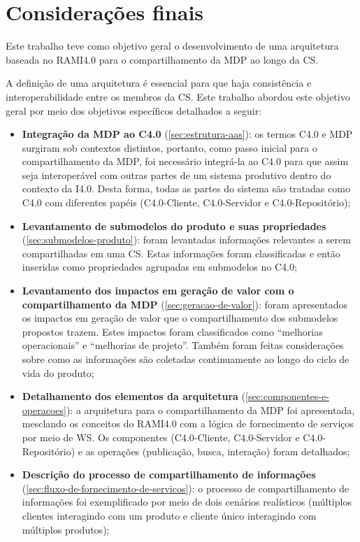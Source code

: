 \chapter{Considerações finais}
\label{cha:conclusao}

Este trabalho teve como objetivo geral o desenvolvimento de uma arquitetura baseada no RAMI4.0 para o compartilhamento da MDP ao longo da CS.

A definição de uma arquitetura é essencial para que haja consistência e interoperabilidade entre os membros da CS. Este trabalho abordou este objetivo geral por meio dos objetivos específicos detalhados a seguir:

\begin{itemize}
	\item \textbf{Integração da MDP ao C4.0} (\autoref{sec:estrutura-aas}): os termos C4.0 e MDP surgiram sob contextos distintos, portanto, como passo inicial para o compartilhamento da MDP, foi necessário integrá-la ao C4.0 para que assim seja interoperável com outras partes de um sistema produtivo dentro do contexto da I4.0. Desta forma, todas as partes do sistema são tratadas como C4.0 com diferentes papéis (C4.0-Cliente, C4.0-Servidor e C4.0-Repositório);
	\item \textbf{Levantamento de submodelos do produto e suas propriedades} (\autoref{sec:submodelos-produto}): foram levantadas informações relevantes a serem compartilhadas em uma CS. Estas informações foram classificadas e então inseridas como propriedades agrupadas em submodelos no C4.0;
	\item \textbf{Levantamento dos impactos em geração de valor com o compartilhamento da MDP} (\autoref{sec:geracao-de-valor}): foram apresentados os impactos em geração de valor que o compartilhamento dos submodelos propostos trazem. Estes impactos foram classificados como ``melhorias operacionais'' e ``melhorias de projeto''. Também foram feitas considerações sobre como as informações são coletadas continuamente ao longo do ciclo de vida do produto;
	\item \textbf{Detalhamento dos elementos da arquitetura} (\autoref{sec:componentes-e-operacoes}): a arquitetura para o compartilhamento da MDP foi apresentada, mesclando os conceitos do RAMI4.0 com a lógica de fornecimento de serviços por meio de WS. Os componentes (C4.0-Cliente, C4.0-Servidor e C4.0-Repositório) e as operações (publicação, busca, interação) foram detalhados;
	\item \textbf{Descrição do processo de compartilhamento de informações} (\autoref{sec:fluxo-de-fornecimento-de-servicos}): o processo de compartilhamento de informações foi exemplificado por meio de dois cenários realísticos (múltiplos clientes interagindo com um produto e cliente único interagindo com múltiplos produtos);

\end{itemize}
